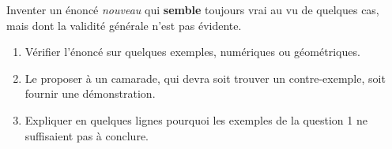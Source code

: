 Inventer un énoncé \emph{nouveau} qui \textbf{semble} toujours vrai au vu de
quelques cas, mais dont la validité générale n'est pas évidente.
\begin{enumerate}
  \item Vérifier l'énoncé sur quelques exemples, numériques ou géométriques.
  \item Le proposer à un camarade, qui devra soit trouver un contre-exemple,
  soit fournir une démonstration.
  \item Expliquer en quelques lignes pourquoi les exemples de la question 1
  ne suffisaient pas à conclure.
\end{enumerate}
